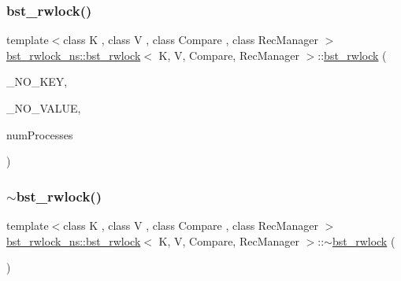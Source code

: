 \mbox{\label{classbst__rwlock__ns_1_1bst__rwlock_a8d8cc1557bc6491508dcfacaf12c9db1}} 
\subsubsection{\texorpdfstring{bst\+\_\+rwlock()}{bst\_rwlock()}\hspace{0.1cm}{\footnotesize\ttfamily [2/2]}}
{\footnotesize\ttfamily template$<$class K , class V , class Compare , class Rec\+Manager $>$ \\
\hyperlink{classbst__rwlock__ns_1_1bst__rwlock}{bst\+\_\+rwlock\+\_\+ns\+::bst\+\_\+rwlock}$<$ K, V, Compare, Rec\+Manager $>$\+::\hyperlink{classbst__rwlock__ns_1_1bst__rwlock}{bst\+\_\+rwlock} (\begin{DoxyParamCaption}\item[{const K}]{\+\_\+\+N\+O\+\_\+\+K\+EY,  }\item[{const V}]{\+\_\+\+N\+O\+\_\+\+V\+A\+L\+UE,  }\item[{const int}]{num\+Processes }\end{DoxyParamCaption})\hspace{0.3cm}{\ttfamily [inline]}}

\mbox{\label{classbst__rwlock__ns_1_1bst__rwlock_aeced6e42f96359b65eeb496563af89a6}} 
\subsubsection{\texorpdfstring{$\sim$bst\+\_\+rwlock()}{~bst\_rwlock()}\hspace{0.1cm}{\footnotesize\ttfamily [2/2]}}
{\footnotesize\ttfamily template$<$class K , class V , class Compare , class Rec\+Manager $>$ \\
\hyperlink{classbst__rwlock__ns_1_1bst__rwlock}{bst\+\_\+rwlock\+\_\+ns\+::bst\+\_\+rwlock}$<$ K, V, Compare, Rec\+Manager $>$\+::$\sim$\hyperlink{classbst__rwlock__ns_1_1bst__rwlock}{bst\+\_\+rwlock} (\begin{DoxyParamCaption}{ }\end{DoxyParamCaption})\hspace{0.3cm}{\ttfamily [inline]}}



